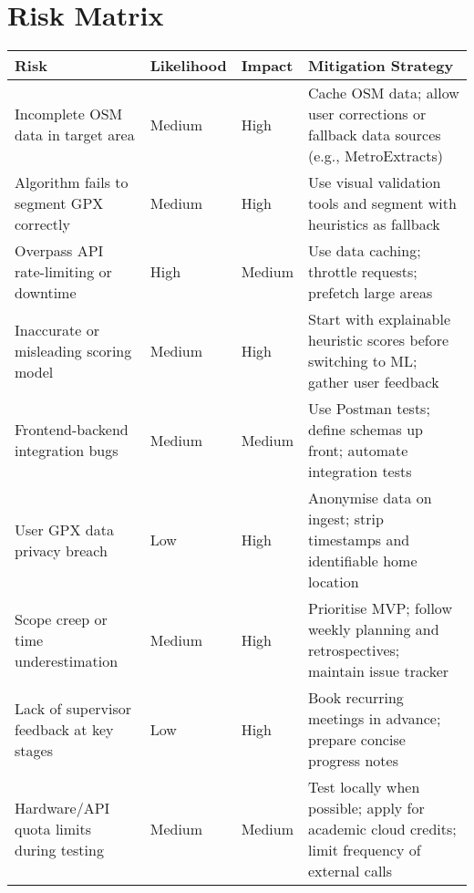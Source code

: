 \documentclass{article}
\begin{document}
\section{Risk Matrix}

\renewcommand{\arraystretch}{1.3}

\begin{center}
	\begin{tabularx}{\textwidth}{>{\RaggedRight\arraybackslash}X
		>{\centering\arraybackslash}m{1.8cm}
		>{\centering\arraybackslash}m{1.8cm}
		>{\RaggedRight\arraybackslash}X}
		\toprule
		\textbf{Risk}                             & \textbf{Likelihood} & \textbf{Impact} & \textbf{Mitigation Strategy}                                                                    \\
		\midrule
		Incomplete OSM data in target area        & Medium              & High            & Cache OSM data; allow user corrections or fallback data sources (e.g., MetroExtracts)           \\
		Algorithm fails to segment GPX correctly  & Medium              & High            & Use visual validation tools and segment with heuristics as fallback                             \\
		Overpass API rate-limiting or downtime    & High                & Medium          & Use data caching; throttle requests; prefetch large areas                                       \\
		Inaccurate or misleading scoring model    & Medium              & High            & Start with explainable heuristic scores before switching to ML; gather user feedback            \\
		Frontend-backend integration bugs         & Medium              & Medium          & Use Postman tests; define schemas up front; automate integration tests                          \\
		User GPX data privacy breach              & Low                 & High            & Anonymise data on ingest; strip timestamps and identifiable home location                       \\
		Scope creep or time underestimation       & Medium              & High            & Prioritise MVP; follow weekly planning and retrospectives; maintain issue tracker               \\
		Lack of supervisor feedback at key stages & Low                 & High            & Book recurring meetings in advance; prepare concise progress notes                              \\
		Hardware/API quota limits during testing  & Medium              & Medium          & Test locally when possible; apply for academic cloud credits; limit frequency of external calls \\
		\bottomrule
	\end{tabularx}
\end{center}
\end{document}
